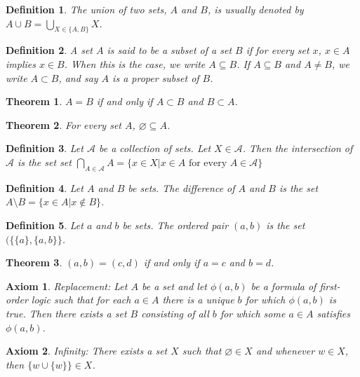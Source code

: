 \documentclass[a4paper]{article}
\newtheorem{mytheorem}{Theorem}
\newtheorem{axiom}{Axiom}
\newtheorem{mydef}{Definition}
\numberwithin{mytheorem}{section}
\numberwithin{mydef}{section}
\numberwithin{axiom}{section}
\numberwithin{example}{section}
\begin{document}
\begin{mydef} The union of two sets, $A$ and $B$, is usually denoted by $A \cup B = \bigcup\limits_{X \in \{ A,B\}} X$.
\end{mydef}

\begin{mydef} A set $A$ is said to be a subset of a set $B$ if for every set $x$, $x \in A$ implies $x \in B$. When this is the case, we write $A \subseteq B$. If $A \subseteq B$ and $A \neq B$, we write $A \subset B$, and say $A$ is a proper subset of $B$. 
\end{mydef}

\begin{mytheorem} $A = B$ if and only if $A \subset B$ and $B \subset A$. \end{mytheorem}

\begin{mytheorem} For every set $A$, $\varnothing \subseteq A$. \end{mytheorem}

\begin{mydef} Let $\mathcal{A}$ be a collection of sets. Let $X \in \mathcal{A}$. Then the intersection of $\mathcal{A}$ is the set set $\bigcap\limits_{A \in \mathcal{A}} A = \{ x \in X | x \in A \text{ for every } A \in \mathcal{A} \}$
\end{mydef}

\begin{mydef} Let $A$ and $B$ be sets. The difference of $A$ and $B$ is the set $A \setminus B = \{ x \in A | x \notin B \}$. 
\end{mydef}

\begin{mydef} Let $a$ and $b$ be sets. The ordered pair $(a,b)$ is the set $( \{ \{ a \}, \{ a, b \} \}$. 
\end{mydef}

\begin{mytheorem} $(a,b) = (c,d)$ if and only if $a = c$ and $b = d$. \end{mytheorem}

\begin{axiom} Replacement: Let $A$ be a set and let $\phi(a,b)$ be a formula of first-order logic such that for each $a \in A$ there is a unique $b$ for which $\phi(a,b)$ is true. Then there exists a set $B$ consisting of all $b$ for which some $a \in A$ satisfies $\phi(a,b)$.  
\end{axiom}

\begin{axiom} Infinity: There exists a set $X$ such that $\varnothing \in X$ and whenever $w \in X$, then $\{ w \cup \{ w \} \} \in X$.
\end{axiom}
\end{document}
